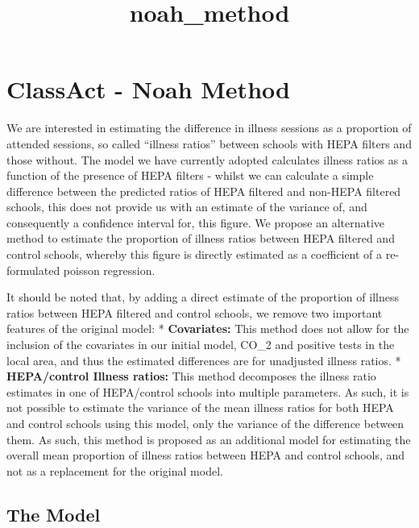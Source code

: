 \documentclass[11pt]{article}
\title{noah\_method}
\begin{document}
    
    \maketitle
    
    

    
    \hypertarget{classact---noah-method}{%
\section{ClassAct - Noah Method}\label{classact---noah-method}}

We are interested in estimating the difference in illness sessions as a
proportion of attended sessions, so called ``illness ratios'' between
schools with HEPA filters and those without. The model we have currently
adopted calculates illness ratios as a function of the presence of HEPA
filters - whilst we can calculate a simple difference between the
predicted ratios of HEPA filtered and non-HEPA filtered schools, this
does not provide us with an estimate of the variance of, and
consequently a confidence interval for, this figure. We propose an
alternative method to estimate the proportion of illness ratios between
HEPA filtered and control schools, whereby this figure is directly
estimated as a coefficient of a re-formulated poisson regression.

It should be noted that, by adding a direct estimate of the proportion
of illness ratios between HEPA filtered and control schools, we remove
two important features of the original model: * \textbf{Covariates:}
This method does not allow for the inclusion of the covariates in our
initial model, CO\_2 and positive tests in the local area, and thus the
estimated differences are for unadjusted illness ratios. *
\textbf{HEPA/control Illness ratios:} This method decomposes the illness
ratio estimates in one of HEPA/control schools into multiple parameters.
As such, it is not possible to estimate the variance of the mean illness
ratios for both HEPA and control schools using this model, only the
variance of the difference between them. As such, this method is
proposed as an additional model for estimating the overall mean
proportion of illness ratios between HEPA and control schools, and not
as a replacement for the original model.

\hypertarget{the-model}{%
\subsection{The Model}\label{the-model}}
\end{document}
